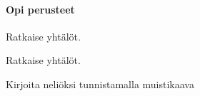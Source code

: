 \begin{tehtavasivu}

\paragraph*{Opi perusteet}

\begin{tehtava}
    Ratkaise yhtälöt.
    \begin{alakohdat}

    \end{alakohdat}
    \begin{vastaus}
        \begin{alakohdat}
        \end{alakohdat}
    \end{vastaus}
\end{tehtava}

\begin{tehtava}
    Ratkaise yhtälöt.
    \begin{alakohdat}
    \end{alakohdat}
    \begin{vastaus}
        \begin{alakohdat}
        \end{alakohdat}
    \end{vastaus}
\end{tehtava}

\begin{tehtava}
    Kirjoita neliöksi tunnistamalla muistikaava
    \begin{alakohdat}
    \end{alakohdat}
    \begin{vastaus}
        \begin{alakohdat}
        \end{alakohdat}
    \end{vastaus}
\end{tehtava}


\end{tehtavasivu}
